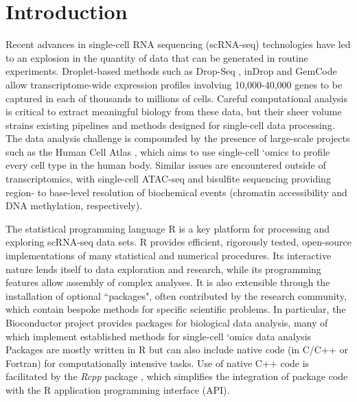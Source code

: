\documentclass[10pt,letterpaper]{article}
\begin{document}
\linenumbers

\section*{Introduction}
Recent advances in single-cell RNA sequencing (scRNA-seq) technologies have led to an explosion in the quantity of data that can be generated in routine experiments.
Droplet-based methods such as Drop-Seq \cite{macosko2015highly}, inDrop \cite{klein2015droplet} and GemCode \cite{zheng2017massively} allow transcriptome-wide expression profiles involving 10,000-40,000 genes to be captured in each of thousands to millions of cells.
Careful computational analysis is critical to extract meaningful biology from these data, but their sheer volume strains existing pipelines and methods designed for single-cell data processing.
The data analysis challenge is compounded by the presence of large-scale projects such as the Human Cell Atlas \cite{regev2017human}, which aims to use single-cell `omics to profile every cell type in the human body.
Similar issues are encountered outside of transcriptomics, with single-cell ATAC-seq \cite{buenrostro2015single} and bisulfite sequencing \cite{smallwood2014single} providing region- to base-level resolution of biochemical events (chromatin accessibility and DNA methylation, respectively).

The statistical programming language R \cite{R} is a key platform for processing and exploring scRNA-seq data sets.
R provides efficient, rigorously tested, open-source implementations of many statistical and numerical procedures.
Its interactive nature lends itself to data exploration and research, while its programming features allow assembly of complex analyses.
It is also extensible through the installation of optional ``packages", often contributed by the research community, which contain bespoke methods for specific scientific problems.
In particular, the Bioconductor project \cite{gentleman2004bioconductor,huber2015orchestrating} provides packages for biological data analysis, many of which implement established methods for single-cell `omics data analysis \cite{trapnell2014dynamics,lun2016pooling,mccarthy2017scater,finak2015mast}
Packages are mostly written in R but can also include native code (in C/C++ or Fortran) for computationally intensive tasks.
Use of native C++ code is facilitated by the \textit{Rcpp} package \cite{eddelbuettel2011seamless}, which simplifies the integration of package code with the R application programming interface (API).
\end{document}
